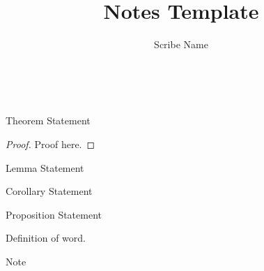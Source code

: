 \documentclass{notes}
\title{Notes Template}
\author{Scribe Name}
\begin{document}
\maketitle

\begin{syntax}


  \separate

  \category[Types]{\tau}
  \\

  \category[Contexts]{\Gamma}


\end{syntax}

\begin{thm}
  Theorem Statement
\end{thm}
\begin{proof}
  Proof here.
\end{proof}

\begin{lem}
  Lemma Statement
\end{lem}

\begin{cor}
  Corollary Statement
\end{cor}

\begin{prop}
  Proposition Statement
\end{prop}

\begin{defn}[Word]
  Definition of word.
\end{defn}

\begin{nb}
  Note
\end{nb}
\end{document}
